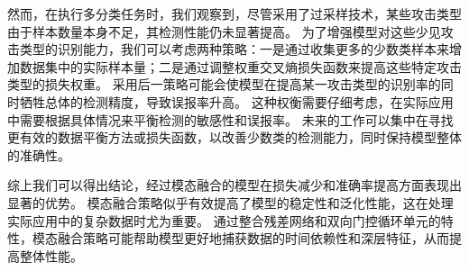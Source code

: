然而，在执行多分类任务时，我们观察到，尽管采用了过采样技术，某些攻击类型由于样本数量本身不足，其检测性能仍未显著提高。
为了增强模型对这些少见攻击类型的识别能力，我们可以考虑两种策略：一是通过收集更多的少数类样本来增加数据集中的实际样本量；二是通过调整权重交叉熵损失函数来提高这些特定攻击类型的损失权重。
采用后一策略可能会使模型在提高某一攻击类型的识别率的同时牺牲总体的检测精度，导致误报率升高。
这种权衡需要仔细考虑，在实际应用中需要根据具体情况来平衡检测的敏感性和误报率。
未来的工作可以集中在寻找更有效的数据平衡方法或损失函数，以改善少数类的检测能力，同时保持模型整体的准确性。\par


综上我们可以得出结论，经过模态融合的模型在损失减少和准确率提高方面表现出显著的优势。
模态融合策略似乎有效提高了模型的稳定性和泛化性能，这在处理实际应用中的复杂数据时尤为重要。
通过整合残差网络和双向门控循环单元的特性，模态融合策略可能帮助模型更好地捕获数据的时间依赖性和深层特征，从而提高整体性能。